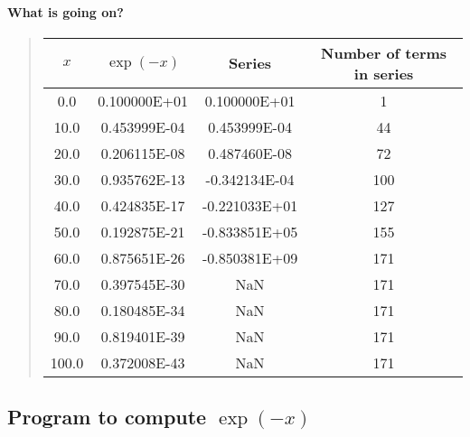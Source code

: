 \documentclass[%
twoside,                 %
final,                   %
10pt]{article}
\newenvironment{paragraphadmon}[1][]{\paragraph{#1}}{}
\begin{document}
\begin{paragraphadmon}[What is going on?]


\begin{quote}
\begin{tabular}{cccc}
\hline
\multicolumn{1}{c}{ $x$ } & \multicolumn{1}{c}{ $\exp{(-x)}$ } & \multicolumn{1}{c}{ Series } & \multicolumn{1}{c}{ Number of terms in series } \\
\hline
0.0                       & 0.100000E+01              & 0.100000E+01              & 1                         \\
10.0                      & 0.453999E-04              & 0.453999E-04              & 44                        \\
20.0                      & 0.206115E-08              & 0.487460E-08              & 72                        \\
30.0                      & 0.935762E-13              & -0.342134E-04             & 100                       \\
40.0                      & 0.424835E-17              & -0.221033E+01             & 127                       \\
50.0                      & 0.192875E-21              & -0.833851E+05             & 155                       \\
60.0                      & 0.875651E-26              & -0.850381E+09             & 171                       \\
70.0                      & 0.397545E-30              & NaN                       & 171                       \\
80.0                      & 0.180485E-34              & NaN                       & 171                       \\
90.0                      & 0.819401E-39              & NaN                       & 171                       \\
100.0                     & 0.372008E-43              & NaN                       & 171                       \\
\hline
\end{tabular}
\end{quote}

\noindent
\end{paragraphadmon}




\subsection{Program to compute $\exp{(-x)}$}
\end{document}
